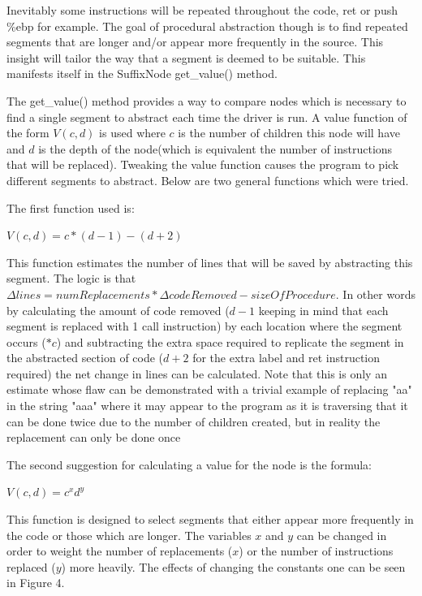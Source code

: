 \documentclass[9pt,nocopyrightspace]{sigplanconf}
\begin{document}
Inevitably some instructions will be repeated throughout the code, ret or push \%ebp for example.
The goal of procedural abstraction though is to find repeated segments that are longer and/or appear more frequently in the source.
This insight will tailor the way that a segment is deemed to be suitable.
This manifests itself in the SuffixNode get\_value() method.

The get\_value() method provides a way to compare nodes which is necessary to find a single segment to abstract each time the driver is run.
A value function of the form $V(c,d)$ is used where $c$ is the number of children this node will have and $d$ is the depth of the node(which is equivalent the number of instructions that will be replaced).
Tweaking the value function causes the program to pick different segments to abstract.
Below are two general functions which were tried.

The first function used is:
\begin{center}
$V(c,d)=c*(d-1)-(d+2)$
\end{center}
This function estimates the number of lines that will be saved by abstracting this segment.
The logic is that $\Delta lines=numReplacements*\Delta codeRemoved - sizeOfProcedure$.
In other words by calculating the amount of code removed ($d-1$ keeping in mind that each segment is replaced with 1 call instruction) by each location where the segment occurs ($*c$) and subtracting the extra space required to replicate the segment in the abstracted section of code ($d+2$ for the extra label and ret instruction required) the net change in lines can be calculated.
Note that this is only an estimate whose flaw can be demonstrated with a trivial example of replacing "aa" in the string "aaa" where it may appear to the program as it is traversing that it can be done twice due to the number of children created, but in reality the replacement can only be done once

The second suggestion for calculating a value for the node is the formula:
\begin{center}
$V(c,d)=c^{x}d^{y}$
\end{center}
This function is designed to select segments that either appear more frequently in the code or those which are longer.
The variables $x$ and $y$ can be changed in order to weight the number of replacements ($x$) or the number of instructions replaced ($y$) more heavily.
The effects of changing the constants one can be seen in Figure 4.
\end{document}
